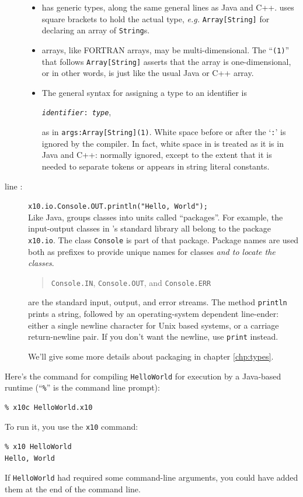 \begin{description}
\begin{itemize}
\item \Xten{} has generic types, along the same general lines as Java and C++. 
\Xten{} uses square brackets to hold the actual type, {\em e.g.} {\tt Array[String]}
for declaring an array of {\tt String}s.

\item \Xten{} arrays, like FORTRAN arrays, may be multi-dimensional. The
``{\tt (1)}'' that follows {\tt Array[String]} asserts that the array is
one-di\-men\-sional, or in other words, is just like the usual Java or C++
array.

\item The general syntax for assigning a type to an identifier is 
\begin{center}{\tt {\em iden\-ti\-fi\-er}: {\em type}},\end{center}
as in {\tt args:Array[String](1)}.  White space before or after the `{\tt :}' is 
ignored by the compiler. In fact, white space in \Xten{} is treated as it
is in Java and C++: normally ignored, except to the extent that it is needed to
separate tokens or appears in string literal constants.
\end{itemize}

\item [line \xlref{hello-code2}{9}:]{\tt x10.io.Console.OUT.println("Hello, World");}\\
Like Java, \Xten{} groups classes into units called ``packages''.  For example,
the input-output classes in \Xten's standard library all belong to the package
{\tt x10.io}. The class {\tt Console} is part of that package.  
Package names are used both as prefixes to provide unique names for classes {\em
and to locate the classes}. 
\begin{quote}{\tt Console.IN},  {\tt Console.OUT}, and  {\tt Console.ERR}\end{quote}
are the standard input, output, and error streams. 
The method  {\tt println} prints a string, followed by an operating-system
dependent line-ender: either a single newline character for Unix based systems, 
or a carriage return-newline pair. If you don't want the newline, use {\tt print} instead.

We'll give some more details about packaging in chapter \ref{chp:types}.
\end{description}

Here's the command for compiling {\tt HelloWorld} for execution by a Java-based
runtime (``{\tt \%}'' is the command line prompt):
\begin{verbatim}
% x10c HelloWorld.x10
\end{verbatim}
To run it, you use the {\tt x10} command:
\begin{verbatim}
% x10 HelloWorld
Hello, World
\end{verbatim}
If {\tt HelloWorld} had required some command-line arguments, you could have
added them at the end of the command line.

